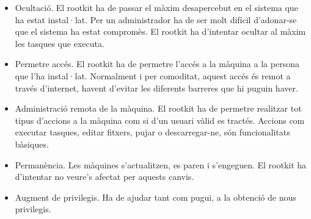 \documentclass[a4paper]{article}
\begin{document}
\begin{itemize}
\item Ocultació. El rootkit ha de passar el màxim desapercebut en el sistema que ha
estat instal·lat. Per un administrador ha de ser molt difícil d'adonar-se que el
sistema ha estat compromès. El rootkit ha d'intentar ocultar al màxim les tasques
que executa.
\item Permetre accés. El rootkit ha de permetre l'accés a la màquina a la persona que
l'ha instal·lat. Normalment i per comoditat, aquest accés és remot a través
d'internet, havent d'evitar les diferents barreres que hi puguin haver.
\item Administració remota de la màquina. El rootkit ha de permetre realitzar tot tipus
d'accions a la màquina com si d'un usuari vàlid es tractés. Accions com executar
tasques, editar fitxers, pujar o descarregar-ne, són funcionalitats bàsiques.
\item Permanència. Les màquines s'actualitzen, es paren i s'engeguen. El rootkit ha
d'intentar no veure's afectat per aquests canvis.
\item Augment de privilegis. Ha de ajudar tant com pugui, a la obtenció de nous
privilegis.
\end{itemize}
\end{document}
